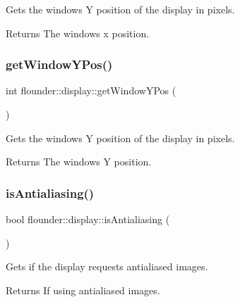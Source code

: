 Gets the windows Y position of the display in pixels. 

\begin{DoxyReturn}{Returns}
The windows x position. 
\end{DoxyReturn}
\mbox{\label{classflounder_1_1display_a92e7674dcd56f1e3f8b617a9b3fb625d}} 
\subsubsection{\texorpdfstring{get\+Window\+Y\+Pos()}{getWindowYPos()}}
{\footnotesize\ttfamily int flounder\+::display\+::get\+Window\+Y\+Pos (\begin{DoxyParamCaption}{ }\end{DoxyParamCaption})}



Gets the windows Y position of the display in pixels. 

\begin{DoxyReturn}{Returns}
The windows Y position. 
\end{DoxyReturn}
\mbox{\label{classflounder_1_1display_ab36d40e6a3be5272853e13e45da750b8}} 
\subsubsection{\texorpdfstring{is\+Antialiasing()}{isAntialiasing()}}
{\footnotesize\ttfamily bool flounder\+::display\+::is\+Antialiasing (\begin{DoxyParamCaption}{ }\end{DoxyParamCaption})}



Gets if the display requests antialiased images. 

\begin{DoxyReturn}{Returns}
If using antialiased images. 
\end{DoxyReturn}
\mbox{\label{classflounder_1_1display_af187a33ad8b4e112a638adfdd3062fb3}} 
